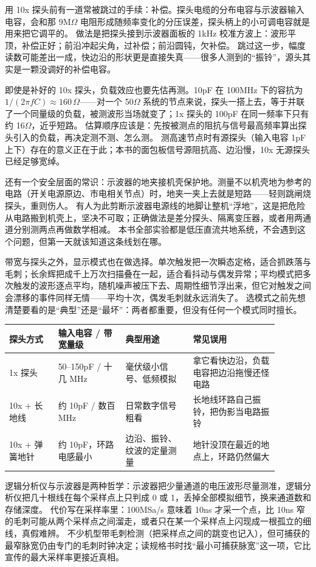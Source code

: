 用 10x 探头前有一道常被跳过的手续：补偿。探头电缆的分布电容与示波器输入电容，会和那 9M$\Omega$ 电阻形成随频率变化的分压误差，探头柄上的小可调电容就是用来把它调平的。
做法是把探头接到示波器面板的 1kHz 校准方波上：波形平顶，补偿正好；前沿冲起尖角，过补偿；前沿圆钝，欠补偿。
跳过这一步，幅度读数可能差出一成，快边沿的形状更是直接失真——很多人测到的“振铃”，源头其实是一颗没调好的补偿电容。

即使是补好的 10x 探头，负载效应也要先估再测。10pF 在 100MHz 下的容抗为 $1/(2\pi f C) \approx 160\,\Omega$——对一个 50$\Omega$ 系统的节点来说，探头一搭上去，等于并联了一个同量级的负载，被测波形当场就变了；1x 探头的 100pF 在同一频率下只有约 16$\Omega$，近乎短路。
估算顺序应该是：先按被测点的阻抗与信号最高频率算出探头引入的负载，再决定测不测、怎么测。
测高速节点时有源探头（输入电容 1pF 上下）存在的意义正在于此；本书的面包板信号源阻抗高、边沿慢，10x 无源探头已经足够宽绰。

还有一个安全层面的常识：示波器的地夹接机壳保护地。测量不以机壳地为参考的电路（开关电源原边、市电相关节点）时，地夹一夹上去就是短路——轻则跳闸烧探头，重则伤人。
有人为此剪断示波器电源线的地脚让整机“浮地”，这是把危险从电路搬到机壳上，坚决不可取；正确做法是差分探头、隔离变压器，或者用两通道分别测两点再做数学相减。
本书全部实验都是低压直流共地系统，不会遇到这个问题，但第一天就该知道这条线划在哪。

带宽与探头之外，显示模式也在做选择。单次触发把一次瞬态定格，适合抓跌落与毛刺；长余辉把成千上万次扫描叠在一起，适合看抖动与偶发异常；平均模式把多次触发的波形逐点平均，随机噪声被压下去、周期性细节浮出来，但它对触发之间会漂移的事件同样无情——平均十次，偶发毛刺就永远消失了。
选模式之前先想清楚要看的是“典型”还是“最坏”：两者都重要，但没有任何一个模式同时擅长。

\begin{longtable}{L{0.16\linewidth}L{0.22\linewidth}L{0.22\linewidth}L{0.28\linewidth}}
\toprule
探头方式 & 输入电容 / 带宽量级 & 典型用途 & 常见误用 \\
\midrule
1x 探头 & 50--150pF / 十几 MHz & 毫伏级小信号、低频模拟 & 拿它看快边沿，负载电容把边沿拖慢还怪电路 \\
10x + 长地线 & 约 10pF / 数百 MHz & 日常数字信号粗看 & 长地线环路自己振铃，把伪影当电路振铃 \\
10x + 弹簧地针 & 约 10pF，环路电感最小 & 边沿、振铃、纹波的定量测量 & 地针没顶在最近的地点上，环路仍然偏大 \\
\bottomrule
\end{longtable}

逻辑分析仪与示波器是两种哲学：示波器把少量通道的电压波形尽量测准，逻辑分析仪把几十根线在每个采样点上只判成 0 或 1，丢掉全部模拟细节，换来通道数和存储深度。
代价写在采样率里：100MSa/s 意味着 10ns 才采一个点，比 10ns 窄的毛刺可能从两个采样点之间溜走，或者只在某一个采样点上闪现成一根孤立的细线，真假难辨。
不少机型带毛刺检测（把采样点之间的跳变也记入），但可捕获的最窄脉宽仍由专门的毛刺时钟决定；读规格书时找“最小可捕获脉宽”这一项，它比宣传的最大采样率更接近真相。

